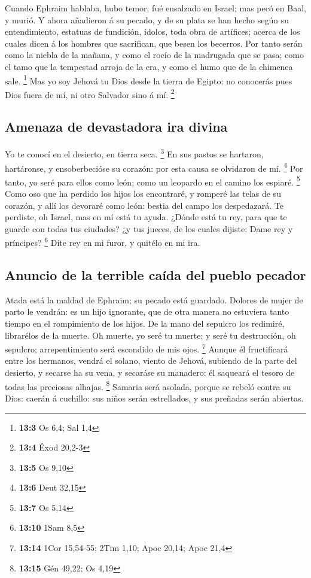  Cuando Ephraim hablaba, hubo temor; fué ensalzado en
Israel; mas pecó en Baal, y murió.  Y ahora añadieron á su
pecado, y de su plata se han hecho según su entendimiento, estatuas de
fundición, ídolos, toda obra de artífices; acerca de los cuales dicen á
los hombres que sacrifican, que besen los becerros.  Por
tanto serán como la niebla de la mañana, y como el rocío de la madrugada
que se pasa; como el tamo que la tempestad arroja de la era, y como el
humo que de la chimenea sale. \footnote{\textbf{13:3} Os 6,4; Sal 1,4}
 Mas yo soy Jehová tu Dios desde la tierra de Egipto: no
conocerás pues Dios fuera de mí, ni otro Salvador sino á mí. \footnote{\textbf{13:4}
  Éxod 20,2-3}

\hypertarget{amenaza-de-devastadora-ira-divina}{%
\subsection{Amenaza de devastadora ira
divina}\label{amenaza-de-devastadora-ira-divina}}

 Yo te conocí en el desierto, en tierra seca. \footnote{\textbf{13:5}
  Os 9,10}  En sus pastos se hartaron, hartáronse, y
ensoberbecióse su corazón: por esta causa se olvidaron de mí.
\footnote{\textbf{13:6} Deut 32,15}  Por tanto, yo seré
para ellos como león; como un leopardo en el camino los espiaré.
\footnote{\textbf{13:7} Os 5,14}  Como oso que ha perdido
los hijos los encontraré, y romperé las telas de su corazón, y allí los
devoraré como león: bestia del campo los despedazará.  Te
perdiste, oh Israel, mas en mí está tu ayuda.  ¿Dónde
está tu rey, para que te guarde con todas tus ciudades? ¿y tus jueces,
de los cuales dijiste: Dame rey y príncipes? \footnote{\textbf{13:10}
  1Sam 8,5}  Díte rey en mi furor, y quitélo en mi ira.

\hypertarget{anuncio-de-la-terrible-cauxedda-del-pueblo-pecador}{%
\subsection{Anuncio de la terrible caída del pueblo
pecador}\label{anuncio-de-la-terrible-cauxedda-del-pueblo-pecador}}

 Atada está la maldad de Ephraim; su pecado está
guardado.  Dolores de mujer de parto le vendrán: es un
hijo ignorante, que de otra manera no estuviera tanto tiempo en el
rompimiento de los hijos.  De la mano del sepulcro los
redimiré, librarélos de la muerte. Oh muerte, yo seré tu muerte; y seré
tu destrucción, oh sepulcro; arrepentimiento será escondido de mis ojos.
\footnote{\textbf{13:14} 1Cor 15,54-55; 2Tim 1,10; Apoc 20,14; Apoc 21,4}
 Aunque él fructificará entre los hermanos, vendrá el
solano, viento de Jehová, subiendo de la parte del desierto, y secarse
ha su vena, y secaráse su manadero: él saqueará el tesoro de todas las
preciosas alhajas. \footnote{\textbf{13:15} Gén 49,22; Os 4,19}
 Samaria será asolada, porque se rebeló contra su Dios:
caerán á cuchillo: sus niños serán estrellados, y sus preñadas serán
abiertas.

